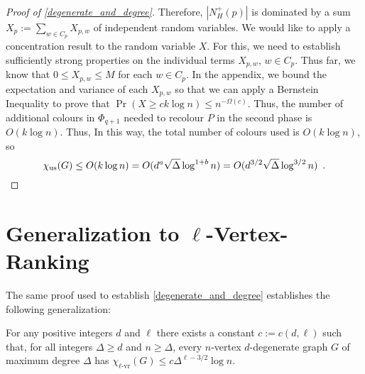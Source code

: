 \documentclass{patmorin}
\newcommand{\rn}[1]{\chi_{\operatorname{#1-vr}}}
\newcommand{\trn}{\chi_{\mathrm{us}}}
\newcommand{\lrn}{\rn{\ell}}
\begin{document}
\begin{proof}[Proof of \cref{degenerate_and_degree}]
  Therefore, $|N_H^+(p)|$ is dominated by a sum $X_p:=\sum_{w\in C_p} X_{p,w}$ of independent random variables.  We would like to apply a concentration result to the random variable $X$.  For this, we need to  establish sufficiently strong properties on the individual terms $X_{p,w}$, $w\in C_p$.  Thus far, we know that $0\le X_{p,w}\le M$ for each $w\in C_p$. In the appendix, we bound the expectation and variance of each $X_{p,w}$ so that we can apply a Bernstein Inequality to prove that $\Pr(X\ge ck\log n)\le n^{-\Omega(c)}$.  Thus, the number of additional colours in $\Phi_{q+1}$ needed to recolour $P$ in the second phase is $O(k\log n)$.  Thus, In this way, the total number of colours used is $O(k\log n)$, so
  \[
    \trn(G) \le O(k \log n) = O(d^a\sqrt{\Delta}\log^{1+b} n) = O(d^{3/2}\sqrt{\Delta}\log^{3/2} n) \enspace . \qedhere
  \]
\end{proof}

\section{Generalization to $\ell$-Vertex-Ranking}

The same proof used to establish \cref{degenerate_and_degree} establishes the following generalization:

\begin{thm}\label{l_degenerate_and_degree}
  For any positive integers $d$ and $\ell$ there exists a constant $c:=c(d,\ell)$ such that, for all integers $\Delta\ge d$ and $n\ge \Delta$, every $n$-vertex $d$-degenerate graph $G$ of maximum degree $\Delta$ has $\lrn(G)\le c\Delta^{\ell-3/2}\log n$.
\end{thm}
\end{document}
